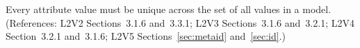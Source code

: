 Every  attribute value must be unique across the set of all
 values in a model.  (References: L2V2 Sections~3.1.6 and~3.3.1;
L2V3 Sections~3.1.6 and~3.2.1; L2V4 Section~3.2.1 and~3.1.6; L2V5 Sections~\ref{sec:metaid} and~\ref{sec:id}.)
